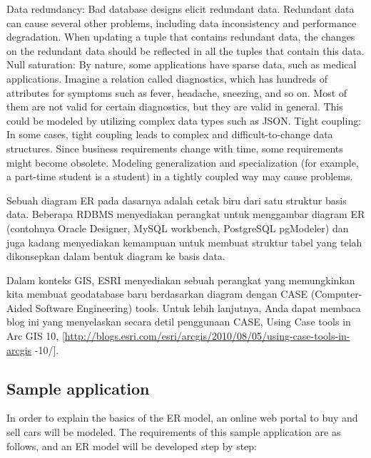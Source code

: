 \documentclass[]{book}
\begin{document}
Data redundancy: Bad database designs elicit redundant data. Redundant data can cause several other problems, including data inconsistency and performance degradation. When updating a tuple that contains redundant data, the changes on the redundant data should be reflected in all the tuples that contain this data.
Null saturation: By nature, some applications have sparse data, such as medical applications. Imagine a relation called diagnostics, which has hundreds of attributes for symptoms such as fever, headache, sneezing, and so on. Most of them are not valid for certain diagnostics, but they are valid in general. This could be modeled by utilizing complex data types such as JSON.
Tight coupling: In some cases, tight coupling leads to complex and difficult-to-change data structures. Since business requirements change with time, some requirements might become obsolete. Modeling generalization and specialization (for example, a part-time student is a student) in a tightly coupled way may cause problems.

Sebuah diagram ER pada dasarnya adalah cetak biru dari satu struktur basis data. Beberapa RDBMS menyediakan perangkat untuk menggambar diagram ER (contohnya Oracle Designer, MySQL workbench, PostgreSQL pgModeler) dan juga kadang menyediakan kemampuan untuk membuat struktur tabel yang telah dikonsepkan dalam bentuk diagram ke basis data.

Dalam konteks GIS, ESRI menyediakan sebuah perangkat yang memungkinkan kita membuat geodatabase baru berdasarkan diagram dengan CASE (Computer-Aided Software Engineering) tools. Untuk lebih lanjutnya, Anda dapat membaca blog ini yang menyelaskan secara detil penggunaan CASE, Using Case tools in Arc GIS 10, {[}\url{http://blogs.esri.com/esri/arcgis/2010/08/05/using-case-tools-in-arcgis} -10/{]}.

\hypertarget{sample-application}{%
\subsection{Sample application}\label{sample-application}}

In order to explain the basics of the ER model, an online web portal to buy and sell cars will be modeled. The requirements of this sample application are as follows, and an ER model will be developed step by step:
\end{document}

